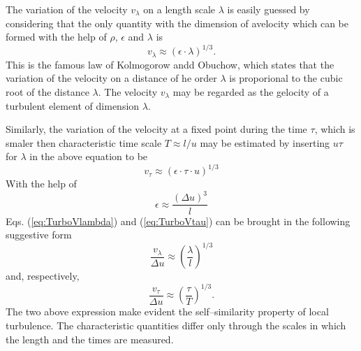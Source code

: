 The variation of the velocity $v_{\lambda}$ on a length scale $\lambda$ is
easily guessed by considering that the only quantity with the dimension of
avelocity which can be formed with the help of $\rho$, $\epsilon$ and
$\lambda$ is
\begin{equation}
\label{eq:TurboVlambda}
  v_{\lambda} \approx (\epsilon \cdot \lambda)^{1/3}.
\end{equation}
This is the famous law of Kolmogorow andd Obuchow, which states that the
variation of the velocity on a distance of he order $\lambda$ is proporional
to the cubic root of the distance $\lambda$. The velocity $v_{\lambda}$ may be
  regarded as the gelocity of a turbulent element of dimension $\lambda$.

Similarly, the variation of the velocity at a fixed point during the time
$\tau$, which is smaler then characteristic time scale $T \approx l/u$ 
may be estimated by inserting $u\tau$ for $\lambda$ in the above equation 
to be
\begin{equation}
\label{eq:TurboVtau}
  v_{\tau} \approx (\epsilon \cdot \tau \cdot u)^{1/3}
\end{equation}
With the help of 
\begin{displaymath}
  \epsilon \approx \frac{(\Delta u)^3}{l}
\end{displaymath}
Eqs. (\ref{eq:TurboVlambda}) and (\ref{eq:TurboVtau}) 
can be brought in the following suggestive form
\begin{displaymath}
  \frac{v_{\lambda}}{\Delta u} \approx \left( \frac{\lambda}{l}\right)^{1/3}
\end{displaymath}
and, respectively,
\begin{displaymath}
 \frac{v_{\tau}}{\Delta u} \approx \left( \frac{\tau}{T}\right)^{1/3} .
\end{displaymath}
The two above expression make evident the self--similarity property of local
turbulence. The characteristic quantities differ only through the scales in
which the length and the times are measured.

